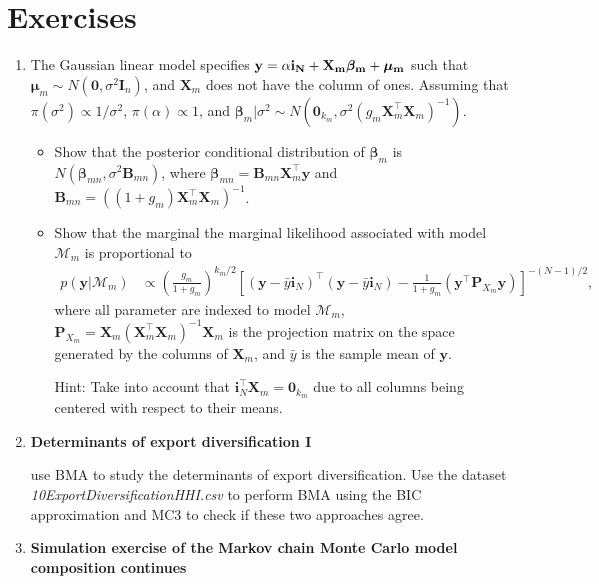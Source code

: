 \section{Exercises}\label{sec10_6}

\begin{enumerate}
	\item The Gaussian linear model specifies $\bf{y}=\alpha\bm{i}_N+\bm{X}_m\bm{\beta}_m+\bm{\mu}_m$ such that $\bm{\mu}_m\sim{N}(\bm{0},\sigma^2\bm{I}_n)$, and $\bm{X}_m$ does not have the column of ones. Assuming that $\pi(\sigma^2)\propto 1/{\sigma^2}$, $\pi(\alpha)\propto 1$, and $\bm{\beta}_m|\sigma^2 \sim {N}(\bm{0}_{k_m}, \sigma^2 (g_m\bm{X}_m^{\top}\bm{X}_m)^{-1})$.
	\begin{itemize}
		\item Show that the posterior conditional distribution of $\bm{\beta}_m$ is $N(\bm{\beta}_{mn},\sigma^2\bm{B}_{mn})$, where $\bm{\beta}_{mn}=\bm{B}_{mn}\bm{X}_m^{\top}\bm{y}$ and $\bm{B}_{mn}=((1+g_m)\bm{X}_m^{\top}\bm{X}_m)^{-1}$.
		\item Show that the marginal the marginal likelihood associated with model $\mathcal{M}_m$ is proportional to
		\begin{align*}
			p(\bm{y}|\mathcal{M}_m)&\propto \left(\frac{g_m}{1+g_m}\right)^{k_m/2} \left[(\bm{y}-\bar{y}\bm{i}_N)^{\top}(\bm{y}-\bar{y}\bm{i}_N)-\frac{1}{1+g_m}(\bm{y}^{\top}\bm{P}_{X_m}\bm{y})\right]^{-(N-1)/2},
		\end{align*}
		where all parameter are indexed to model $\mathcal{M}_m$, $\bm{P}_{X_m}=\bm{X}_m(\bm{X}_m^{\top}\bm{X}_m)^{-1}\bm{X}_m$ is the projection matrix on the space generated by the columns of $\bm{X}_m$, and $\bar{y}$ is the sample mean of $\bm{y}$.
		
		Hint: Take into account that $\bm{i}_N^{\top}\bm{X}_m=\bm{0}_{k_m}$ due to all columns being centered with respect to their means.
	\end{itemize}

\item \textbf{Determinants of export diversification I}

\cite{Jetter2015} use BMA to study the determinants of export diversification. Use the dataset \textit{10ExportDiversificationHHI.csv} to perform BMA using the BIC approximation and MC3 to check if these two approaches agree. 

\item \textbf{Simulation exercise of the Markov chain Monte Carlo model composition continues}


\end{enumerate}
